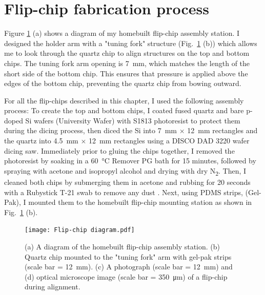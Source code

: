 \documentclass[double,12pt,1in,seploa]{beavtex}
\let\Oldsection\section
\renewcommand{\section}{\FloatBarrier\Oldsection}
\begin{document}
\section{Flip-chip fabrication process} \label{FCfab}
Figure \ref{flip-chip diagram} (a) shows a diagram of my homebuilt flip-chip assembly station. I designed the holder arm with a "tuning fork" structure (Fig.\ \ref{flip-chip diagram} (b)) which allows me to look through the quartz chip to align structures on the top and bottom chips. The tuning fork arm opening is \SI{7}{\milli\meter}, which matches the length of the short side of the bottom chip. This ensures that pressure is applied above the edges of the bottom chip, preventing the quartz chip from bowing outward. 

For all the flip-chips described in this chapter, I used the following assembly process: To create the top and bottom chips, I coated fused quartz and bare p-doped Si wafers (University Wafer) with S1813 photoresist to protect them during the dicing process, then diced the Si into \SI{7}{\milli\meter} $\times$ \SI{12}{\milli\meter} rectangles and the quartz into \SI{4.5}{\milli\meter} $\times$ \SI{12}{\milli\meter} rectangles using a DISCO DAD 3220 wafer dicing saw. Immediately prior to gluing the chips together, I removed the photoresist by soaking in a \SI{60}{\celsius} Remover PG bath for 15 minutes, followed by spraying with acetone and isopropyl alcohol and drying with dry N\textsubscript{2}. Then, I cleaned both chips by submerging them in acetone and rubbing for 20 seconds with a Rubystick T-21 swab to remove any dust \cite{lane_integrating_2021}. Next, using PDMS strips, (Gel-Pak), I mounted them to the homebuilt flip-chip mounting station as shown in Fig.\ \ref{flip-chip diagram} (b). 

\begin{figure}
    \texttt{[image: Flip-chip diagram.pdf]}
    \caption{(a) A diagram of the homebuilt flip-chip assembly station. (b) Quartz chip mounted to the "tuning fork" arm with gel-pak strips (scale bar = \SI{12}{\milli\meter}). (c) A photograph (scale bar = \SI{12}{\milli\meter}) and (d) optical microscope image (scale bar = \SI{350}{\micro\meter}) of a flip-chip during alignment.}
    \label{flip-chip diagram}
\end{figure}
\end{document}
